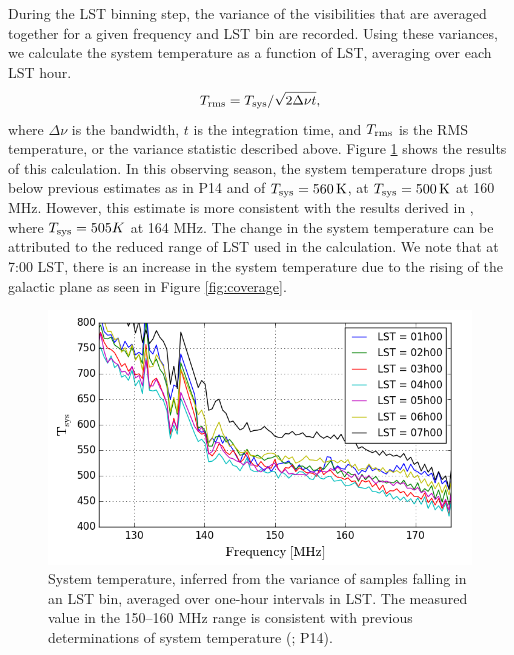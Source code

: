 \documentclass[twocolumn,numberedappendix]{emulateapj} \shorttitle{New Limits on the 21 cm Power Spectrum at $z=8.4$}
\newcommand{\Tsys}{T_{\rm sys}}
\begin{document}
During the LST binning step, the variance of the visibilities that are averaged
together for a given frequency and LST bin are recorded. Using these variances,
we calculate the system temperature as a function of LST, averaging over each
LST hour. 
\begin{equation}
    T_{\rm rms} = \Tsys/\sqrt{2\Delta\nu t}, 
\end{equation}
where $\Delta\nu$ is the bandwidth, $t$ is the integration time, and
$T_{\rm rms}$ is the RMS temperature, or the variance statistic described above.
Figure \ref{fig:tsys} shows the results of this calculation. In this observing
season, the system temperature drops just below previous estimates 
as in P14 and \citet{jacobs_et_al2014} of $\Tsys=560\,\textrm{K}$, at
$\Tsys=500\,\textrm{K}$ at 160 MHz. However, this estimate is more consistent
with the results derived in \citep{moore_et_al2015}, where $\Tsys=505K$ at 164
MHz. The change in the system temperature can be attributed to the reduced
range of LST used in the calculation. We note that at 7:00 LST, there is an
increase in the system temperature due to the rising of the galactic plane as
seen in Figure \ref{fig:coverage}.

\begin{figure}\centering
\includegraphics[width=\columnwidth]{plots/tsys.png}
\caption{System temperature, inferred from the variance of samples falling 
in an LST bin, averaged over one-hour intervals in LST.  The measured value
in the 150--160 MHz range is consistent with previous determinations of
system temperature (\citealt{jacobs_et_al2014}; P14).
}\label{fig:tsys}
\end{figure}
\end{document}
